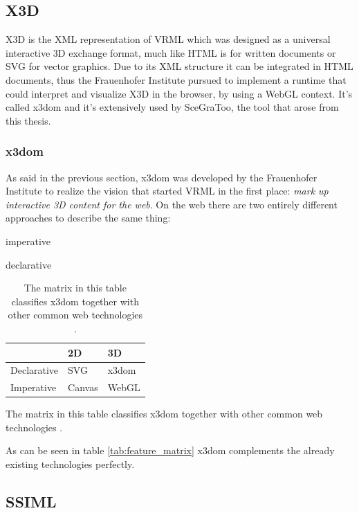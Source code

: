 \subsection{X3D}
\label{x3d}

X3D \cite{x3d} is the XML representation of VRML which was designed as a
universal interactive 3D exchange format, much like HTML is for written
documents or \gls{SVG} for vector graphics. Due to its XML structure it can be
integrated in HTML documents, thus the Frauenhofer Institute pursued to
implement a runtime that could interpret and visualize X3D in the browser, by
using a WebGL context. It's called x3dom \cite{x3dom} and it's extensively used
by SceGraToo, the tool that arose from this thesis.

\subsubsection{x3dom}
\label{par:x3dom}

As said in the previous section, x3dom was developed by the Frauenhofer
Institute to realize the vision that started VRML in the first place: \emph{mark
up interactive 3D content for the web}. On the web there are two entirely
different approaches to describe the same thing:

\begin{itemize*}
  \item imperative
  \item declarative
\end{itemize*}

\begin{longtable}[c]{@{}lll@{}}
  \caption{The matrix in this table classifies x3dom together with other common web technologies \cite{x3dom}.}\\
  \toprule
  & 2D & 3D\tabularnewline
  \midrule
  \endhead
  Declarative & \gls{SVG} \cite{svg} & x3dom \cite{x3dom} \tabularnewline
  Imperative  & Canvas \cite{canvas} & WebGL \cite{webgl} \tabularnewline
  \bottomrule
\end{longtable}
\begin{table}
  \caption{The matrix in this table classifies x3dom together with other common web technologies \cite{x3dom}.}
  \label{tab:feature_matrix}
\end{table}

As can be seen in table \ref{tab:feature_matrix} x3dom complements the already existing technologies
perfectly.

\subsection{SSIML}
\label{ssiml}

